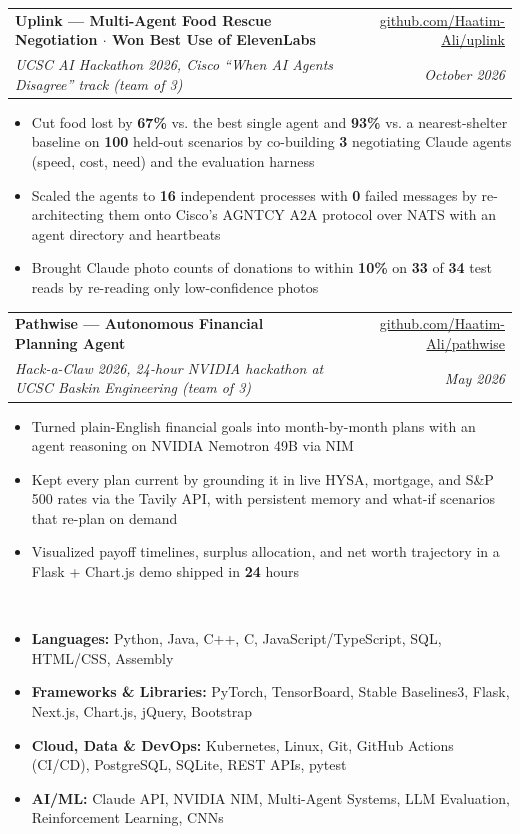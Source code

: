 \documentclass[letterpaper,10pt]{article}
\makeatletter
\newcommand{\resitem}[1]{\item #1 \vspace{-6pt}}
\newcommand{\resheading}[1]{\vspace{7pt}{\Large \textbf{#1}}\\\vspace{-8pt}\hrulefill}
\newcommand{\ressubheading}[4]{\vspace{2pt}
\begin{tabular*}{7.0in}{l@{\cftdotfill{\cftsecdotsep}\extracolsep{\fill}}r}
        \textbf{#1} & #2 \\
        \textit{#3} & \textit{#4} \\
\end{tabular*}\vspace{-6pt}}
\makeatother
\begin{document}
\ressubheading{Uplink --- Multi-Agent Food Rescue Negotiation $\cdot$ Won Best Use of ElevenLabs}{\href{https://github.com/Haatim-Ali/uplink}{github.com/Haatim-Ali/uplink}}{UCSC AI Hackathon 2026, Cisco ``When AI Agents Disagree'' track (team of 3)}{October 2026}
\begin{itemize}
    \resitem{Cut food lost by \textbf{67\%} vs. the best single agent and \textbf{93\%} vs. a nearest-shelter baseline on \textbf{100} held-out scenarios by co-building \textbf{3} negotiating Claude agents (speed, cost, need) and the evaluation harness}
    \resitem{Scaled the agents to \textbf{16} independent processes with \textbf{0} failed messages by re-architecting them onto Cisco's AGNTCY A2A protocol over NATS with an agent directory and heartbeats}
    \resitem{Brought Claude photo counts of donations to within \textbf{10\%} on \textbf{33} of \textbf{34} test reads by re-reading only low-confidence photos}
\end{itemize}

\ressubheading{Pathwise --- Autonomous Financial Planning Agent}{\href{https://github.com/Haatim-Ali/pathwise}{github.com/Haatim-Ali/pathwise}}{Hack-a-Claw 2026, 24-hour NVIDIA hackathon at UCSC Baskin Engineering (team of 3)}{May 2026}
\begin{itemize}
    \resitem{Turned plain-English financial goals into month-by-month plans with an agent reasoning on NVIDIA Nemotron 49B via NIM}
    \resitem{Kept every plan current by grounding it in live HYSA, mortgage, and S\&P 500 rates via the Tavily API, with persistent memory and what-if scenarios that re-plan on demand}
    \resitem{Visualized payoff timelines, surplus allocation, and net worth trajectory in a Flask + Chart.js demo shipped in \textbf{24} hours}
\end{itemize}

\resheading{Technical Skills}
\vspace{-6pt}
\begin{itemize}
    \resitem{\textbf{Languages:} Python, Java, C++, C, JavaScript/TypeScript, SQL, HTML/CSS, Assembly}
    \resitem{\textbf{Frameworks \& Libraries:} PyTorch, TensorBoard, Stable Baselines3, Flask, Next.js, Chart.js, jQuery, Bootstrap}
    \resitem{\textbf{Cloud, Data \& DevOps:} Kubernetes, Linux, Git, GitHub Actions (CI/CD), PostgreSQL, SQLite, REST APIs, pytest}
    \resitem{\textbf{AI/ML:} Claude API, NVIDIA NIM, Multi-Agent Systems, LLM Evaluation, Reinforcement Learning, CNNs}
\end{itemize}
\end{document}
